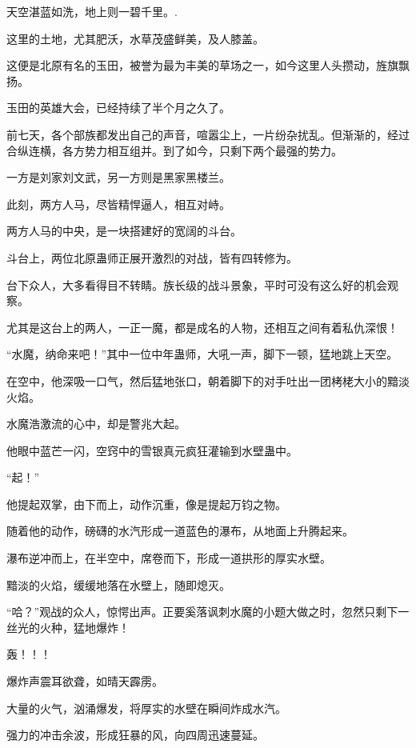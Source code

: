 
\begin{this_body}

天空湛蓝如洗，地上则一碧千里。.

这里的土地，尤其肥沃，水草茂盛鲜美，及人膝盖。

这便是北原有名的玉田，被誉为最为丰美的草场之一，如今这里人头攒动，旌旗飘扬。

玉田的英雄大会，已经持续了半个月之久了。

前七天，各个部族都发出自己的声音，喧嚣尘上，一片纷杂扰乱。但渐渐的，经过合纵连横，各方势力相互组并。到了如今，只剩下两个最强的势力。

一方是刘家刘文武，另一方则是黑家黑楼兰。

此刻，两方人马，尽皆精悍逼人，相互对峙。

两方人马的中央，是一块搭建好的宽阔的斗台。

斗台上，两位北原蛊师正展开激烈的对战，皆有四转修为。

台下众人，大多看得目不转睛。族长级的战斗景象，平时可没有这么好的机会观察。

尤其是这台上的两人，一正一魔，都是成名的人物，还相互之间有着私仇深恨！

“水魔，纳命来吧！”其中一位中年蛊师，大吼一声，脚下一顿，猛地跳上天空。

在空中，他深吸一口气，然后猛地张口，朝着脚下的对手吐出一团栲栳大小的黯淡火焰。

水魔浩激流的心中，却是警兆大起。

他眼中蓝芒一闪，空窍中的雪银真元疯狂灌输到水壁蛊中。

“起！”

他提起双掌，由下而上，动作沉重，像是提起万钧之物。

随着他的动作，磅礴的水汽形成一道蓝色的瀑布，从地面上升腾起来。

瀑布逆冲而上，在半空中，席卷而下，形成一道拱形的厚实水壁。

黯淡的火焰，缓缓地落在水壁上，随即熄灭。

“哈？”观战的众人，惊愕出声。正要奚落讽刺水魔的小题大做之时，忽然只剩下一丝光的火种，猛地爆炸！

轰！！！

爆炸声震耳欲聋，如晴天霹雳。

大量的火气，汹涌爆发，将厚实的水壁在瞬间炸成水汽。

强力的冲击余波，形成狂暴的风，向四周迅速蔓延。


\end{this_body}
